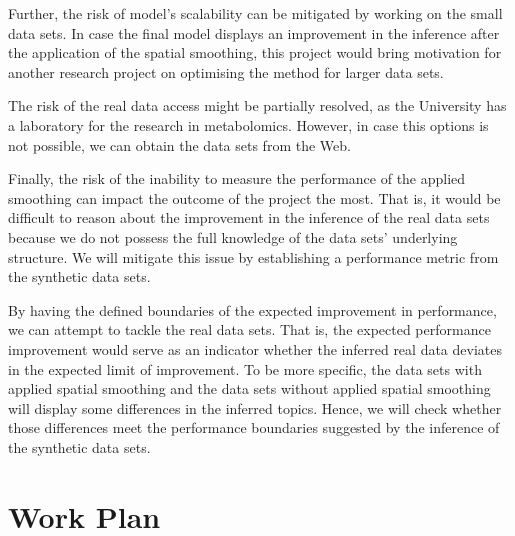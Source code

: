 \documentclass{mprop}
\begin{document}
\par Further, the risk of model's scalability can be mitigated by working on the small data sets. In case the final model displays an improvement in the inference after the application of the spatial smoothing, this project would bring motivation for another research project on optimising the method for larger data sets. 

\par The risk of the real data access might be partially resolved, as the University has a laboratory for the research in metabolomics. However, in case this options is not possible, we can obtain the data sets from the Web. 

\par Finally, the risk of the inability to measure the performance of the applied smoothing can impact the outcome of the project the most. That is, it would be difficult to reason about the improvement in the inference of the real data sets because we do not possess the full knowledge of the data sets' underlying structure. We will mitigate this issue by establishing a performance metric from the synthetic data sets. 

\par By having the defined boundaries of the expected improvement in performance, we can attempt to tackle the real data sets. That is, the expected performance improvement would serve as an indicator whether the inferred real data deviates in the expected limit of improvement. To be more specific, the data sets with applied spatial smoothing and the data sets without applied spatial smoothing will display some differences in the inferred topics. Hence, we will check whether those differences meet the performance boundaries suggested by the inference of the synthetic data sets. 


\section{Work Plan}
\end{document}
